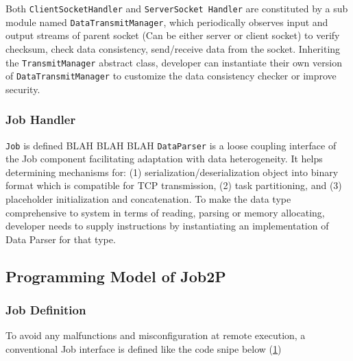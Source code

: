 \documentclass[conference]{IEEEtran}
\begin{document}
Both \texttt{ClientSocketHandler} and \texttt{ServerSocket Handler} are constituted by a sub module named \texttt{DataTransmitManager}, which periodically observes input and output streams of parent socket (Can be either server or client socket) to verify checksum, check data consistency, send/receive data from the socket. Inheriting the \texttt{TransmitManager} abstract class, developer can instantiate their own version of \texttt{DataTransmitManager} to customize the data consistency checker or improve security. 

\subsubsection{Job Handler}
\texttt{Job} is defined BLAH BLAH BLAH
\texttt{DataParser} is a loose coupling interface of the Job component facilitating adaptation with data heterogeneity. It helps determining mechanisms for: (1) serialization/deserialization object into binary format which is compatible for TCP transmission, (2) task partitioning, and (3) placeholder initialization and concatenation. To make the data type comprehensive to system in terms of reading, parsing or memory allocating, developer needs to supply instructions by instantiating an implementation of Data Parser for that type. 

\subsection{Programming Model of Job2P} 

\subsubsection{Job Definition}\label{job-description}

To avoid any malfunctions and misconfiguration at remote execution, a conventional Job interface is defined like the code snipe below (\ref{code:job_def}) \\

\begin{figure}
\noindent {}	
	\label{code:job_def}
\end{figure}
\end{document}

